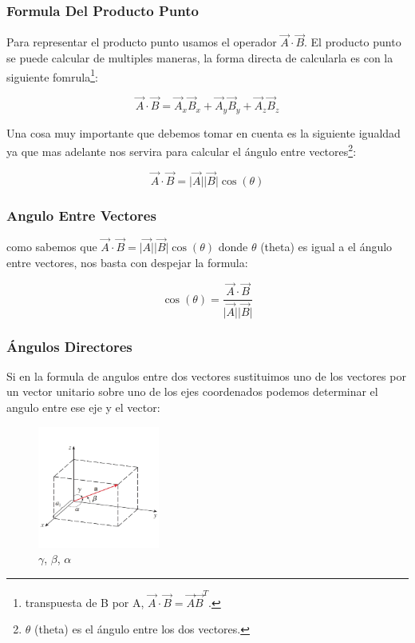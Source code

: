 \documentclass{article}
\begin{document}
\subsubsection*{Formula Del Producto Punto}
\label{sec:orgaafae56}
Para representar el producto punto usamos el operador \(\vec{A} \cdot \vec{B}\). 
El producto punto se puede calcular de multiples maneras, la forma directa de calcularla es con la siguiente fomrula\footnote{transpuesta de B por A, \(\vec{A} \cdot \vec{B} = \vec{A}\vec{B}^T\).}:

\[
\vec{A} \cdot \vec{B} = \vec{A}_x \vec{B}_x + \vec{A}_y \vec{B}_y + \vec{A}_z \vec{B}_z
\]

Una cosa muy importante que debemos tomar en cuenta es la siguiente igualdad ya que mas adelante nos servira para calcular el ángulo entre vectores\footnote{\(\theta\) (theta) es el ángulo entre los dos vectores.}:

\[
\vec{A}\cdot\vec{B} = \vert\vec{A}\vert\vert\vec{B}\vert \cos(\theta)
\]

\subsubsection*{Angulo Entre Vectores}
\label{sec:org493fc13}
como sabemos que \(\vec{A}\cdot\vec{B} = \vert\vec{A}\vert\vert\vec{B}\vert \cos(\theta)\) donde \(\theta\) (theta) es igual a el ángulo entre vectores, nos basta con despejar la formula:

\[
\cos(\theta) = \frac{ \vec{A} \cdot \vec{B} }{ \vert \vec{A} \vert \vert \vec{B} \vert }
\]


\subsubsection*{Ángulos Directores}
\label{sec:orgbe6cef4}
Si en la formula de angulos entre dos vectores sustituimos uno de los vectores por un vector unitario sobre uno de los ejes coordenados podemos determinar el angulo entre ese eje y el vector:

\begin{figure}[htbp]
\centering
\includegraphics[width=4cm]{img/angulos-directores.png}
\caption{\(\gamma\), \(\beta\), \(\alpha\)}
\end{figure}
\end{document}
